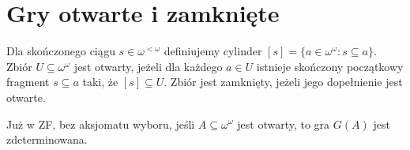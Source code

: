 \section{Gry otwarte i zamknięte}
\begin{definicja}\label{def:baire-cylinders}
Dla skończonego ciągu $s\in\omega^{<\omega}$ definiujemy cylinder $[s]=\{a\in\omega^\omega:s\subseteq a\}$. Zbiór $U\subseteq\omega^\omega$ jest otwarty, jeżeli dla każdego $a\in U$ istnieje skończony początkowy fragment $s\subseteq a$ taki, że $[s]\subseteq U$. Zbiór jest zamknięty, jeżeli jego dopełnienie jest otwarte.
\end{definicja}
\begin{twierdzenie}\label{thm:open-determinacy}
Już w ZF, bez aksjomatu wyboru, jeśli
$A\subseteq\omega^\omega$ jest otwarty,
to gra $G(A)$ jest zdeterminowana.
\end{twierdzenie}
